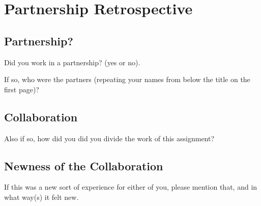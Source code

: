 \documentclass{article}
\begin{document}
\newpage
\section{Partnership Retrospective}

\subsection{Partnership?}
Did you work in a partnership? (yes or no).

If so, who were the partners (repeating your names from below the title on the first page)?

\subsection{Collaboration}
Also if so, how did you did you divide the work of this assignment?

\subsection{Newness of the Collaboration}
If this was a new sort of experience for either of you, please mention that,
and in what way(s) it felt new.
\end{document}
